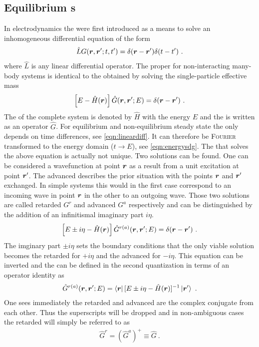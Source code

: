 \subsection{Equilibrium \cgfnc s}
In electrodynamics the \gfnc{} were first introduced as a means to solve an inhomogeneous differential equation of the form
\begin{align}
\hat{L}G(\boldsymbol{r},\boldsymbol{r}';t,t') = \delta(\boldsymbol{r}-\boldsymbol{r}')\delta(t-t')\ .
\label{eqn:lineardiff}
\end{align}
where $\hat{L}$ is any linear differential operator. The proper \gfnc{} for non-interacting many-body systems is identical to the \gfnc{} obtained by solving the single-particle effective mass \sdg{} \cite{ferry1999transport}
\begin{align}
\left[ E -\hat{H}(\boldsymbol{r})\right] \hat{G}(\boldsymbol{r},\boldsymbol{r}';E) = \delta (\boldsymbol{r}-\boldsymbol{r}')\ .
\label{eqn:energysdg}
\end{align}
The \hamil{} of the complete system is denoted by $\hat{H}$ with the energy $E$ and the \gfnc{} is written as an operator $\hat{G}$.
For equilibrium \cite{fetter2003quantum} and non-equilibrium steady state \cite{haug2008quantum} the \gfnc{} only depends on time differences, see \cref{eqn:lineardiff}. It can therefore be \textsc{Fourier} transformed to the energy domain ($t \rightarrow E$), see \cref{eqn:energysdg}. The \gfnc{} that solves the above equation is actually not unique. Two solutions can be found. One can be considered a wavefunction at point $\boldsymbol{r}$ as a result from a unit excitation at point $\boldsymbol{r}'$. The advanced \gfnc{} describes the prior situation with the points $\boldsymbol{r}$ and $\boldsymbol{r}'$ exchanged. In simple systems this would in the first case correspond to an incoming wave in point $\boldsymbol{r}$ in the other to an outgoing wave.
Those two solutions are called retarded \gfnc{} $G^r$ and advanced \gfnc{} $G^a$ respectively and can be distinguished by the addition of an infinitismal imaginary part $i\eta$. \begin{align}
\left[ E \pm i \eta -\hat{H}(\boldsymbol{r})\right] \hat{G}^{r(a)}(\boldsymbol{r},\boldsymbol{r}';E) = \delta (\boldsymbol{r}-\boldsymbol{r}')\ .
\end{align}
The imginary part $\pm i\eta$ sets the boundary conditions that the only viable solution becomes the retarded \gfnc{} for $+i\eta$ and the advanced \gfnc{} for $-i \eta$.
This equation can be inverted and the \gfnc{} can be defined in the second quantization in terms of an operator identity as
\begin{align}
\hat{G}^{r(a)}(\boldsymbol{r},\boldsymbol{r}';E) = \left< \boldsymbol{r} \right| [E\pm i \eta - \hat{H}(\boldsymbol{r})]^{-1} \left| \boldsymbol{r}' \right>\ .
\end{align}
One sees immediately the retarded and advanced \gfnc{} are the complex conjugate from each other. Thus the superscripts will be dropped and in non-ambiguous cases the retarded \gfnc{} will simply be referred to as \gfnc{}
\begin{align}
\hat{G}^r = (\hat{G}^a)^+ \equiv \hat{G}\ .
\end{align}
